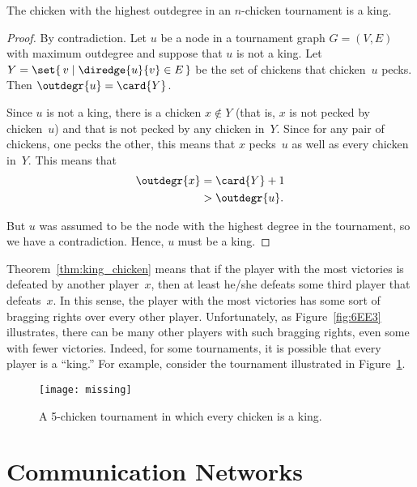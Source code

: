 \begin{theorem}\label{thm:king_chicken}
The  chicken with the highest  outdegree
in an $n$-chicken tournament is a king.
\end{theorem}

\begin{proof}
By contradiction.  Let $u$ be a node in a tournament graph $G = (V,
E)$ with maximum outdegree and suppose that $u$ is not a king.  Let $Y
= \set{\, v \mid \diredge{u}{v} \in E \,}$ be the set of chickens that
chicken~$u$ pecks.  Then $\outdegr{u} = \card{Y}$.

Since $u$ is not a king, there is a chicken $x \notin Y$ (that is, $x$
is not pecked by chicken~$u$) and that is not pecked by any chicken
in~$Y$.  Since for any pair of chickens, one pecks the other, this
means that $x$ pecks~$u$ as well as every chicken in~$Y$.  This means
that
\begin{align*}
    \outdegr{x} &= \card{Y} + 1 \\
                &> \outdegr{u}.
\end{align*}

But $u$ was assumed to be the node with the highest degree in the
tournament, so we have a contradiction.  Hence, $u$ must be a king.
\end{proof}

Theorem~\ref{thm:king_chicken} means that if the player with the most
victories is defeated by another player~$x$, then at least he/she
defeats some third player that defeats~$x$.  In this sense, the player
with the most victories has some sort of bragging rights over every
other player.  Unfortunately, as Figure~\ref{fig:6EE3} illustrates,
there can be many other players with such bragging rights, even some
with fewer victories.  Indeed, for some tournaments, it is possible
that every player is a ``king.''  For example, consider the tournament
illustrated in Figure~\ref{fig:6EE4}.

\begin{figure}

\missinggraphic

\texttt{[image: missing]}

\caption{A 5-chicken tournament in which every chicken is a king.}

\label{fig:6EE4}

\end{figure}

\section{Communication Networks}\label{sec:comm_nets}

